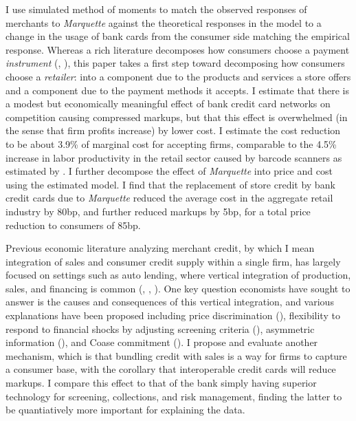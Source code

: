 \documentclass[12pt,english]{article}
\begin{document}
I use simulated method of moments to match the observed responses of merchants to \emph{Marquette} against the theoretical responses in the model to a change in the usage of bank cards from the consumer side matching the empirical response. Whereas a rich literature decomposes how consumers choose a payment \emph{instrument} (\cite{arango_consumer_2015}, \cite{huynh_equilibrium_2022}), this paper takes a first step toward decomposing how consumers choose a \emph{retailer}: into a component due to the products and services a store offers and a component due to the payment methods it accepts. I estimate that there is a modest but economically meaningful effect of bank credit card networks on competition causing compressed markups, but that this effect is overwhelmed (in the sense that firm profits increase) by lower cost. I estimate the cost reduction to be about 3.9\% of marginal cost for accepting firms, comparable to the 4.5\% increase in labor productivity in the retail sector caused by barcode scanners as estimated by \cite{basker_raising_2012}. I further decompose the effect of \emph{Marquette} into price and cost using the estimated model. I find that the replacement of store credit by bank credit cards due to \emph{Marquette} reduced the average cost in the aggregate retail industry by 80bp, and further reduced markups by 5bp, for a total price reduction to consumers of 85bp.

Previous economic literature analyzing merchant credit, by which I mean integration of sales and consumer credit supply within a single firm, has largely focused on settings such as auto lending, where vertical integration of production, sales, and financing  is common (\cite{adams_liquidity_2009}, \cite{benetton_credit_2022}, \cite{banner_competition_1958}).  One key question economists have sought to answer is the causes and consequences of this vertical integration, and various explanations have been proposed including price discrimination (\cite{brennan_vendor_1988}), flexibility to respond to financial shocks by adjusting screening criteria (\cite{benetton_credit_2022}), asymmetric information (\cite{stroebel_asymmetric_2016}), and Coase commitment (\cite{murfin_who_2019}). I propose and evaluate another mechanism, which is that bundling credit with sales is a way for firms to capture a consumer base, with the corollary that interoperable credit cards will reduce markups. I compare this effect to that of the bank simply having superior technology for screening, collections, and risk management, finding the latter to be quantiatively more important for explaining the data. 
\end{document}
